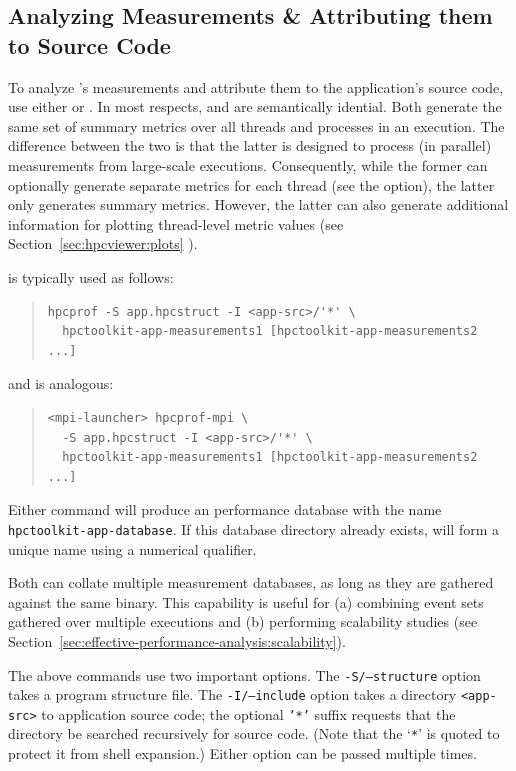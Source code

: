 \documentclass[11pt,letterpaper]{report}
\begin{document}
\subsection{Analyzing Measurements \& Attributing them to Source Code}

To analyze \HPCToolkit{}'s measurements and attribute them to the application's source code, use either \hpcprof{} or \hpcprofmpi{}.
In most respects, \hpcprof{} and \hpcprofmpi{} are semantically idential.
Both generate the same set of summary metrics over all threads and processes in an execution.
The difference between the two is that the latter is designed to process (in parallel) measurements from large-scale executions.
Consequently, while the former can optionally generate separate metrics for each thread (see the  option), the latter only generates summary metrics.
However, the latter can also generate additional information for plotting thread-level metric values (see Section~\ref{sec:hpcviewer:plots}%
).

\hpcprof{} is typically used as follows:
\begin{quote}
\begin{verbatim}
hpcprof -S app.hpcstruct -I <app-src>/'*' \
  hpctoolkit-app-measurements1 [hpctoolkit-app-measurements2 ...]
\end{verbatim}
\end{quote}
and \hpcprofmpi{} is analogous:
\begin{quote}
\begin{verbatim}
<mpi-launcher> hpcprof-mpi \
  -S app.hpcstruct -I <app-src>/'*' \
  hpctoolkit-app-measurements1 [hpctoolkit-app-measurements2 ...]
\end{verbatim}
\end{quote}
Either command will produce an \HPCToolkit{} performance database with the name \texttt{hpctoolkit-app-database}.
If this database directory already exists, \hpcprofAll{} will form a unique name using a numerical qualifier.

Both \hpcprofAll{} can collate multiple measurement databases, as long as they are gathered against the same binary.
This capability is useful for (a) combining event sets gathered over multiple executions and (b) performing scalability studies (see Section~\ref{sec:effective-performance-analysis:scalability}).

The above commands use two important options.
The \texttt{-S/--structure} option takes a program structure file.
The \texttt{-I/--include} option takes a directory \texttt{<app-src>} to application source code; the optional \texttt{'*'} suffix requests that the directory be searched recursively for source code.
(Note that the `\texttt{*}' is quoted to protect it from shell expansion.)
Either option can be passed multiple times.
\end{document}
